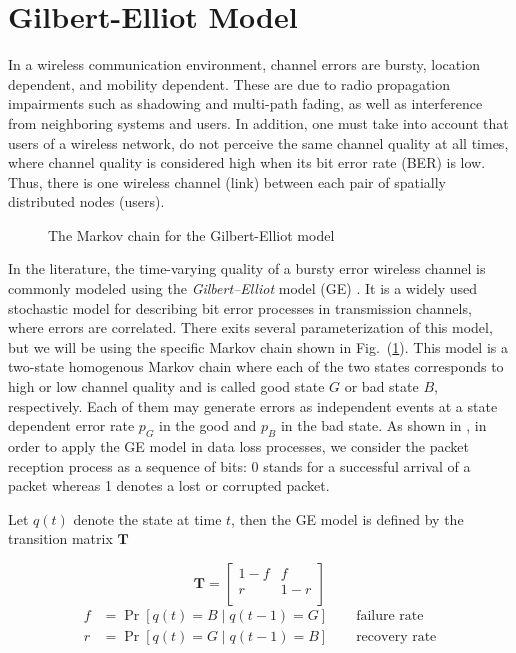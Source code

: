 \section{Gilbert-Elliot Model} \label{sec:GE}

In a wireless communication environment, channel errors are bursty, location
dependent, and mobility dependent. These are due to radio propagation
impairments such as shadowing and multi-path fading, as well as interference
from neighboring systems and users. In addition, one must take into account that
users of a wireless network, do not perceive the same channel quality at all
times, where channel quality is considered high when its bit error rate (BER) is
low. Thus, there is one wireless channel (link) between each pair of spatially
distributed nodes (users). 

\begin{figure}[h]
  \centering
   
  \caption{The Markov chain for the Gilbert-Elliot model}
  \label{fig:GE_FSM}
\end{figure}

In the literature, the time-varying quality of a bursty error wireless channel
is commonly modeled using the \textit{Gilbert–Elliot} model (GE)
\cite{gilbert1960capacity, elliott1963estimates}. It is a widely used stochastic
model for describing bit error processes in transmission channels, where errors
are correlated. There exits several parameterization of this model, but we will
be using the specific Markov chain shown in Fig.~(\ref{fig:GE_FSM}). This model
is a two-state homogenous Markov chain where each of the two states corresponds
to high or low channel quality and is called good state $G$ or bad state $B$,
respectively. Each of them may generate errors as independent events at a state
dependent error rate $p_G$ in the good and $p_B$ in the bad state. As shown in
\cite{hasslinger2008gilbert}, in order to apply the GE model in data loss
processes, we consider the packet reception process as a sequence of bits: 0
stands for a successful arrival of a packet whereas 1 denotes a lost or
corrupted packet.

Let $q(t)$ denote the state at time $t$, then the GE model is defined by the
transition matrix $\boldsymbol{T}$

\begin{equation}
  \boldsymbol{T} = 
  \begin{bmatrix}
    1-f & f \\
    r & 1-r \\
  \end{bmatrix}
\end{equation}
\begin{align}
  f &= \Pr[q(t) = B \mid q(t-1) = G] \qquad \textrm{failure rate} \\
  r &= \Pr[q(t) = G \mid q(t-1) = B] \qquad \textrm{recovery rate}
\end{align}

